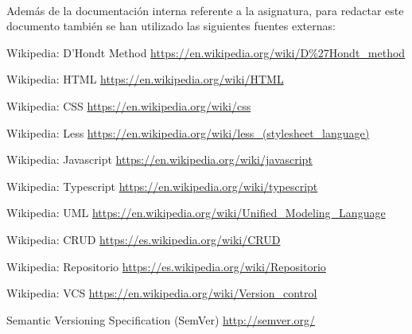 \documentclass{article}
\begin{document}
           	\paragraph{}
			Además de la documentación interna referente a la asignatura, para redactar este documento también se han utilizado las siguientes fuentes externas:

            
            \begin{thebibliography}{}
            	Wikipedia: D'Hondt Method \url{https://en.wikipedia.org/wiki/D%27Hondt_method}
            
            	Wikipedia: HTML \url{https://en.wikipedia.org/wiki/HTML}
            	
            	Wikipedia: CSS \url{https://en.wikipedia.org/wiki/css}
                            	
            	Wikipedia: Less \url{https://en.wikipedia.org/wiki/less_(stylesheet_language)}
                            	
            	Wikipedia: Javascript \url{https://en.wikipedia.org/wiki/javascript}
                
            	Wikipedia: Typescript \url{https://en.wikipedia.org/wiki/typescript}
                
                Wikipedia: UML \url{https://en.wikipedia.org/wiki/Unified_Modeling_Language}
                
                Wikipedia: CRUD \url{https://es.wikipedia.org/wiki/CRUD}
                
                Wikipedia: Repositorio \url{https://es.wikipedia.org/wiki/Repositorio}
                
                Wikipedia: VCS \url{https://en.wikipedia.org/wiki/Version_control}
                
                Semantic Versioning Specification (SemVer) \url{http://semver.org/}
            \end{thebibliography}
\end{document}
